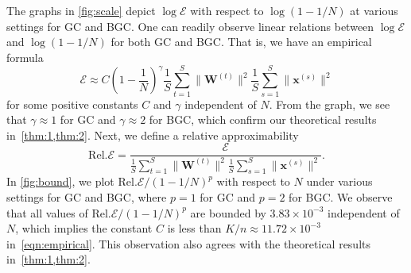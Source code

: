 \documentclass[preprint,12pt,authoryear]{elsarticle}
\numberwithin{equation}{section}
\theoremstyle{remark}
\newcommand\bW{\mathbf{W}}
\newcommand\bx{\mathbf{x}}
\newcommand\E{\mathcal{E}}
\begin{document}
The graphs in \cref{fig:scale} depict $\log \E$ with respect to $\log (1 - 1/N)$ at various settings for GC and BGC.
One can readily observe linear relations between $\log \E$ and $\log (1 - 1/N)$ for both GC and BGC.
That is, we have an empirical formula
\begin{equation}
    \label{eqn:empirical}
    \E \approx C \left(1 - \frac{1}{N} \right)^{\gamma} \frac{1}{S}\sum_{t=1}^{S} \| \bW^{(t)} \|^{2} \frac{1}{S}\sum_{s=1}^{S} \| \bx^{(s)} \|^{2}
\end{equation}
for some positive constants $C$ and $\gamma$ independent of $N$.
From the graph, we see that $\gamma \approx 1$ for GC and $\gamma \approx 2$ for BGC, which confirm our theoretical results in~\cref{thm:1,thm:2}.
Next, we define a relative approximability
\begin{equation}
    \mathrm{Rel.}\E = \frac{\E}{\frac{1}{S}\sum_{t=1}^{S} \| \bW^{(t)} \|^{2} \frac{1}{S}\sum_{s=1}^{S} \| \bx^{(s)} \|^{2}}.
\end{equation}
In \cref{fig:bound}, we plot $\mathrm{Rel.}\E/(1-1/N)^{p}$ with respect to $N$ under various settings for GC and BGC, where $p=1$ for GC and $p=2$ for BGC.
We observe that all values of $\mathrm{Rel.}\E/(1-1/N)^{p}$ are bounded by $3.83 \times 10^{-3}$ independent of $N$, which implies the constant $C$ is less than $K/n \approx 11.72 \times 10^{-3}$ in~\eqref{eqn:empirical}.
This observation also agrees with the theoretical results in~\cref{thm:1,thm:2}.

\end{document}
